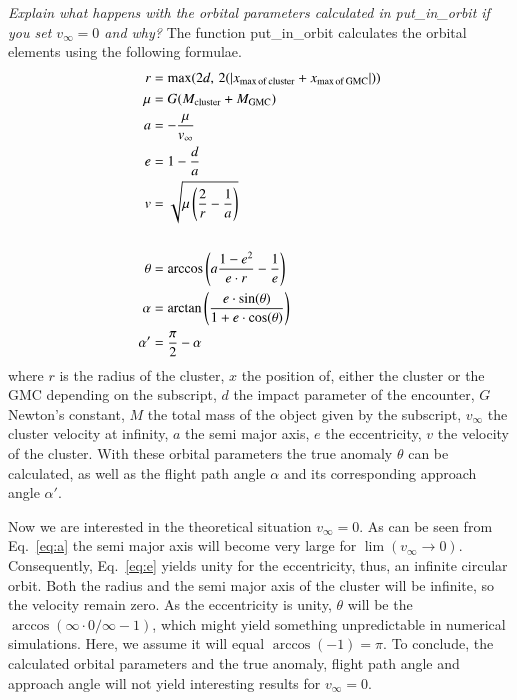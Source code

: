\documentclass{aa}
\begin{document}
\textit{Explain what happens with the orbital parameters calculated in put\_in\_orbit if you set $v_\infty = 0$ and why?}
The function put\_in\_orbit calculates the orbital elements using the following formulae.
\begin{align}
    r &= \text{max}(2d, \, 2 (\left| x_{\rm max \, of \, cluster} + x_{\rm max \, of \, GMC}\right|)) \\
    \mu &= G (M_{\rm cluster} + M_{\rm GMC}) \\
    a &= -\frac{\mu}{v_\infty} \label{eq:a} \\
    e &= 1 - \frac{d}{a} \label{eq:e} \\
    v &= \sqrt{\mu \left(\frac{2}{r} - \frac{1}{a}\right)} \\
    \newline \nonumber \\
    \theta &= \arccos \left(a \frac{1-e^2}{e\cdot r} - \frac{1}{e} \right) \\
    \alpha &=  \arctan \left(\frac{e\cdot \sin(\theta)}{1 + e\cdot \cos(\theta)}\right) \\
    \alpha' &= \frac{\pi}{2} - \alpha
\end{align}
where $r$ is the radius of the cluster, $x$ the position of, either the cluster or the GMC depending on the subscript, $d$ the impact parameter of the encounter, $G$ Newton's constant, $M$ the total mass of the object given by the subscript, $v_\infty$ the cluster velocity at infinity, $a$ the semi major axis, $e$ the eccentricity, $v$ the velocity of the cluster. With these orbital parameters the true anomaly $\theta$ can be calculated, as well as the flight path angle $\alpha$ and its corresponding approach angle $\alpha'$.

Now we are interested in the theoretical situation $v_\infty = 0$. As can be seen from Eq.~\eqref{eq:a} the semi major axis will become very large for $\lim (v_\infty \rightarrow 0)$. Consequently, Eq.~\eqref{eq:e} yields unity for the eccentricity, thus, an infinite circular orbit. Both the radius and the semi major axis of the cluster will be infinite, so the velocity remain zero. As the eccentricity is unity, $\theta$ will be the $\arccos(\infty\cdot0/\infty - 1)$, which might yield something unpredictable in numerical simulations. Here, we assume it will equal $\arccos(-1) = \pi$. To conclude, the calculated orbital parameters and the true anomaly, flight path angle and approach angle will not yield interesting results for $v_\infty = 0$.
\end{document}
